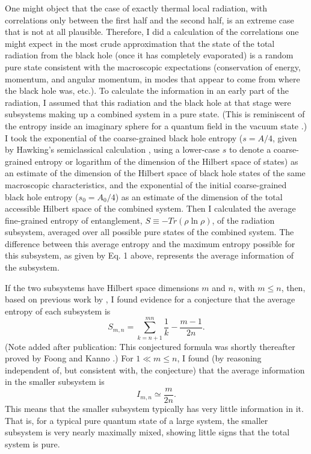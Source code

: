      One might object that the case of exactly thermal local
radiation, with
correlations only between the first half and the second half, is an
extreme
case that is not at all plausible.  Therefore, I did a calculation
\cite{Paginfo} of the
correlations one might expect in the most crude approximation that
the state of
the total radiation from the black hole (once it has completely
evaporated) is
a random pure state consistent with the macroscopic expectations
(conservation
of energy, momentum, and angular momentum, in modes that appear to
come from
where the black hole was, etc.).  To calculate the information in an
early part
of the radiation, I assumed that this radiation and the black hole at
that
stage were subsystems making up a combined system in a pure state.
(This is reminiscent of the entropy inside an imaginary sphere
for a quantum field in the vacuum state \cite{Bom,Sred93}.)  I took
the
exponential of the coarse-grained black hole entropy ($s=A/4$, given
by
Hawking's semiclassical calculation \cite{Haw75,Haw76a},
using a lower-case $s$ to
denote a coarse-grained entropy or logarithm of the dimension of the
Hilbert
space of states) as an estimate of the dimension of the Hilbert space
of black
hole states of the same macroscopic characteristics, and the
exponential of the
initial coarse-grained black hole entropy ($s_0=A_0/4$) as an
estimate of the
dimension of the total accessible Hilbert space of the combined
system.  Then I
calculated the average fine-grained entropy of entanglement,
$S\equiv-Tr(\rho\ln\rho)$, of the
radiation subsystem, averaged over all possible pure states of the
combined
system.  The difference between this average entropy and the maximum
entropy
possible for this subsystem, as given by Eq. 1 above, represents the
average
information of the subsystem.

     If the two subsystems have Hilbert space dimensions $m$ and $n$,
with
$m\leq n$, then, based on previous work by \cite{Lub,Llo}, I found
\cite{PagEnt}
evidence for a conjecture that the average entropy of each subsystem
is
     	\begin{equation}
	S_{m,n}=\sum_{k=n+1}^{mn}\frac{1}{k} - \frac{m-1}{2n}.
	\end{equation}
(Note added after publication:  This conjectured formula was shortly
thereafter proved by Foong and Kanno \cite{FooKan}.)
For $1\ll m\leq n$, I found (by reasoning independent of, but
consistent with,
the conjecture) that the average information in the smaller subsystem
is
	\begin{equation}
	I_{m,n} \simeq \frac{m}{2n}.
	\end{equation}
This means that the smaller subsystem typically has very little
information in
it.  That
is, for a typical pure quantum state of a large system, the smaller
subsystem
is very nearly maximally mixed, showing little signs that the total
system is
pure.

